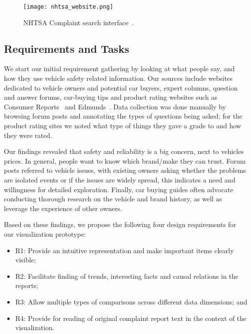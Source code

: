 	\begin{figure}
	   \centering  
	   \texttt{[image: nhtsa\_website.png]}
	   \caption[NHTSA Complaint search interface]{NHTSA Complaint search
	   interface~\cite{nhtsa}.}
	   \label{figure:nhtsa}
	\end{figure}



\subsection{Requirements and Tasks}

We start our initial requirement gathering by looking at what people say, and
how they use vehicle safety related information. Our sources include websites 
dedicated to vehicle owners and potential car buyers, expert columns, 
question and answer forums, car-buying tips and product rating websites such 
as Consumer Reports~\cite{consumerReports} and Edmunds~\cite{edmunds}. Data
collection was done manually by browsing forum posts and annotating the types of
questions being asked; for the product rating sites we noted what type of things
they gave a grade to and how they were rated.


Our findings revealed that safety and reliability is a big concern, next to
vehicles prices. In general, people want to know which brand/make 
they can trust. Forum posts referred to vehicle issues, with existing owners 
asking whether the problems are isolated events or if the issues are widely
spread, this indicates a need and willingness for detailed exploration. Finally, car buying 
guides often advocate conducting thorough research on the vehicle and brand history, 
as well as leverage the experience of other owners. 
 
Based on these findings, we propose the following four design requirements for
our visualization prototype:
\begin{itemize}[noitemsep]
  \item R1: Provide an intuitive representation and make important items clearly
  visible;
  \item R2: Facilitate finding of trends, interesting facts and causal relations
  in the reports;
  \item R3: Allow multiple types of comparisons across different data
  dimensions; and
  \item R4: Provide for reading of original complaint report text in the context
  of the visualization.
\end{itemize}

